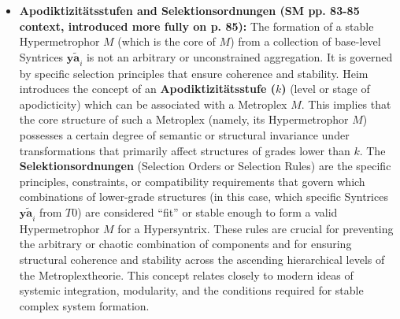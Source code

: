 \documentclass[12pt]{article}
\newcommand{\q}[1]{\enquote{#1}}
\newcommand{\syntrix}{\bm{y\widetilde{a}}}
\newcommand{\aspektivsystem}{P}
\newcommand{\syntrixtotalitaet}{T0}
\def\metroplex#1#2{M}%
\newcommand{\hypersyntrix}{\metroplex{1}{F}}
\newcommand{\hypermetrophor}[1]{%
  \metroplex{#1}{a}%
}
\begin{document}
\begin{itemize}
\begin{itemize}
\begin{itemize}
            \item \textbf{Exzenter (Eccentric Combination of Hypersyntrizen) (SM Eq. 20b, p. 83):} This describes an excentric connection that involves a Koppelung rule (\( K \), which implies \(K_m \neq 0\)) between a specific hyper-syndrome component (denoted \( (l,m) \)) of the Hypersyntrix \( \hypersyntrix_a \) and another hyper-syndrome component (denoted \( (m') \)) of the Hypersyntrix \( \hypersyntrix_b \). Heim's notation \( (l,m) \) and \( (m') \) here refers to specific elements within a hyper-syndrome at a certain level of \( \hypersyntrix_a \) being linked to a similar component in \( \hypersyntrix_b \).
            \begin{equation}
            \metroplex{1}[a]^{(1)} \left\{ \begin{smallmatrix} \mathrm{K}_s & \mathrm{C}_s \\ \mathrm{K}_m & \mathrm{C}_m \end{smallmatrix} \right\}^{(m)} \metroplex{1}[b], \overline{|\mathrm{B}|}, \metroplex{1}[c]
            \tag{20b}
            \end{equation}
            (Again, \( \aspektivsystem_b \) refers to the contextual aspect system. The \( K \) implies an excentric Korporator).
        \end{itemize}
    \end{itemize}

    \item \textbf{Apodiktizitätsstufen and Selektionsordnungen (SM pp. 83-85 context, introduced more fully on p. 85):}
    The formation of a stable Hypermetrophor \( \hypermetrophor{1} \) (which is the core of \( \hypersyntrix \)) from a collection of base-level Syntrices \( \syntrix_i \) is not an arbitrary or unconstrained aggregation. It is governed by specific selection principles that ensure coherence and stability. Heim introduces the concept of an \textbf{Apodiktizitätsstufe (\( k \))} (level or stage of apodicticity) which can be associated with a Metroplex \( \metroplex{n}{} \). This implies that the core structure of such a Metroplex (namely, its Hypermetrophor \( \hypermetrophor{n-1}{} \)) possesses a certain degree of semantic or structural invariance under transformations that primarily affect structures of grades lower than \( k \). The \textbf{Selektionsordnungen} (Selection Orders or Selection Rules) are the specific principles, constraints, or compatibility requirements that govern which combinations of lower-grade structures (in this case, which specific Syntrices \( \syntrix_i \) from \( \syntrixtotalitaet \)) are considered \q{fit} or stable enough to form a valid Hypermetrophor \( \hypermetrophor{1}{} \) for a Hypersyntrix. These rules are crucial for preventing the arbitrary or chaotic combination of components and for ensuring structural coherence and stability across the ascending hierarchical levels of the Metroplextheorie. This concept relates closely to modern ideas of systemic integration, modularity, and the conditions required for stable complex system formation.
\end{itemize}
\end{document}
